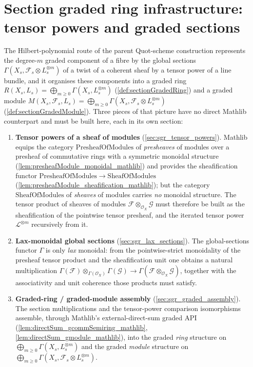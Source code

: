 \chapter{Section graded ring infrastructure: tensor powers and graded sections}
\label{chap:Picard_SectionGradedRing}

\providecommand{\PshMod}{\mathrm{PresheafOfModules}}
\providecommand{\ShMod}{\mathrm{SheafOfModules}}
\providecommand{\Modules}{\mathrm{Modules}}

The Hilbert-polynomial route of the parent Quot-scheme construction represents the
degree-\(m\) graded component of a fibre by the global sections
\(\Gamma(X_s, \mathcal{F}_s \otimes L_s^{\otimes m})\) of a twist of a coherent
sheaf by a tensor power of a line bundle, and it organises these components into
a graded ring \(R(X_s, L_s) = \bigoplus_{m \ge 0} \Gamma(X_s, L_s^{\otimes m})\)
(\cref{def:sectionGradedRing}) and a graded module
\(M(X_s, \mathcal{F}_s, L_s) = \bigoplus_{m \ge 0}
\Gamma(X_s, \mathcal{F}_s \otimes L_s^{\otimes m})\)
(\cref{def:sectionGradedModule}). Three pieces of that picture have no direct
Mathlib counterpart and must be built here, each in its own section:

\begin{enumerate}
  \item \textbf{Tensor powers of a sheaf of modules}
    (\cref{sec:sgr_tensor_powers}). Mathlib equips the category
    \(\PshMod\) of \emph{presheaves} of modules over a presheaf of commutative
    rings with a symmetric monoidal structure
    (\cref{lem:presheafModule_monoidal_mathlib}) and provides the
    sheafification functor \(\PshMod \to \ShMod\)
    (\cref{lem:presheafModule_sheafification_mathlib}); but the category
    \(\ShMod\) of \emph{sheaves} of modules carries \emph{no} monoidal
    structure. The tensor product of sheaves of modules
    \(\mathcal{F} \otimes_{\mathcal{O}_X} \mathcal{G}\) must therefore be built
    as the sheafification of the pointwise tensor presheaf, and the iterated
    tensor power \(\mathcal{L}^{\otimes m}\) recursively from it.
  \item \textbf{Lax-monoidal global sections} (\cref{sec:sgr_lax_sections}).
    The global-sections functor \(\Gamma\) is only \emph{lax} monoidal: from the
    pointwise-strict monoidality of the presheaf tensor product and the
    sheafification unit one obtains a natural multiplication
    \(\Gamma(\mathcal{F}) \otimes_{\Gamma(\mathcal{O}_X)} \Gamma(\mathcal{G})
    \to \Gamma(\mathcal{F} \otimes_{\mathcal{O}_X} \mathcal{G})\), together with
    the associativity and unit coherence those products must satisfy.
  \item \textbf{Graded-ring / graded-module assembly}
    (\cref{sec:sgr_graded_assembly}). The section multiplications and the
    tensor-power comparison isomorphisms assemble, through Mathlib's
    external-direct-sum graded API (\cref{lem:directSum_gcommSemiring_mathlib},
    \cref{lem:directSum_gmodule_mathlib}), into the graded \emph{ring} structure
    on \(\bigoplus_{m \ge 0} \Gamma(X_s, L_s^{\otimes m})\) and the graded
    \emph{module} structure on
    \(\bigoplus_{m \ge 0} \Gamma(X_s, \mathcal{F}_s \otimes L_s^{\otimes m})\).
\end{enumerate}

